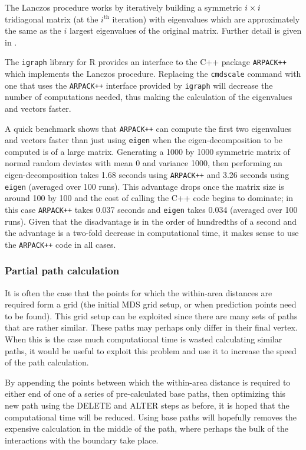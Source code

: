 The  Lanczos procedure works by iteratively building a symmetric $i\times i$ tridiagonal matrix (at the $i^{\text{th}}$ iteration) with eigenvalues which are approximately the same as the $i$ largest eigenvalues of the original matrix. Further detail is given in .

The \texttt{igraph} library for \textsf{R} provides an interface to the C++ package \texttt{ARPACK++} which implements the Lanczos procedure. Replacing the \texttt{cmdscale} command with one that uses the \texttt{ARPACK++} interface provided by \texttt{igraph} will decrease the number of computations needed, thus making the calculation of the eigenvalues and vectors faster.

A quick benchmark shows that \texttt{ARPACK++} can compute the first two eigenvalues and vectors faster than just using \texttt{eigen} when the eigen-decomposition to be computed is of a large matrix. Generating a 1000 by 1000 symmetric matrix of normal random deviates with mean 0 and variance 1000, then performing an eigen-decomposition takes 1.68 seconds using \texttt{ARPACK++} and 3.26 seconds using \texttt{eigen} (averaged over 100 runs). This advantage drops once the matrix size is around 100 by 100 and the cost of calling the C++ code begins to dominate; in this case \texttt{ARPACK++} takes 0.037 seconds and \texttt{eigen} takes 0.034 (averaged over 100 runs). Given that the disadvantage is in the order of hundredths of a second and the advantage is a two-fold decrease in computational time, it makes sense to use the \texttt{ARPACK++} code in all cases.


\subsubsection{Partial path calculation}

It is often the case that the points for which the within-area distances are required form a grid (the initial MDS grid setup, or when prediction points need to be found). This grid setup can be exploited since there are many sets of paths that are rather similar. These paths may perhaps only differ in their final vertex. When this is the case much computational time is wasted calculating similar paths, it would be useful to exploit this problem and use it to increase the speed of the path calculation.

By appending the points between which the within-area distance is required to either end of one of a series of pre-calculated base paths, then optimizing this new path using the DELETE and ALTER steps as before, it is hoped that the computational time will be reduced. Using base paths will hopefully removes the expensive calculation in the middle of the path, where perhaps the bulk of the interactions with the boundary take place.


